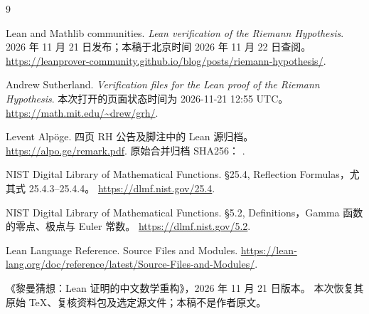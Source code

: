 \documentclass[UTF8,fontset=fandol,a4paper,openany,oneside]{ctexbook}
\theoremstyle{definition}
\theoremstyle{remark}
\begin{document}
\backmatter
\begin{thebibliography}{9}
Lean and Mathlib communities.
\emph{Lean verification of the Riemann Hypothesis}.
2026 年 11 月 21 日发布；本稿于北京时间 2026 年 11 月 22 日查阅。
\url{https://leanprover-community.github.io/blog/posts/riemann-hypothesis/}.

Andrew Sutherland.
\emph{Verification files for the Lean proof of the Riemann Hypothesis}.
本次打开的页面状态时间为 2026-11-21 12:55 UTC。
\url{https://math.mit.edu/~drew/grh/}.

Levent Alpöge.
四页 RH 公告及脚注中的 Lean 源归档。
\url{https://alpo.ge/remark.pdf}.
原始合并归档 SHA256：
.

NIST Digital Library of Mathematical Functions.
§25.4, Reflection Formulas，尤其式 25.4.3--25.4.4。
\url{https://dlmf.nist.gov/25.4}.

NIST Digital Library of Mathematical Functions.
§5.2, Definitions，Gamma 函数的零点、极点与 Euler 常数。
\url{https://dlmf.nist.gov/5.2}.

Lean Language Reference. Source Files and Modules.
\url{https://lean-lang.org/doc/reference/latest/Source-Files-and-Modules/}.

《黎曼猜想：Lean 证明的中文数学重构》，2026 年 11 月 21 日版本。
本次恢复其原始 TeX、复核资料包及选定源文件；本稿不是作者原文。
\end{thebibliography}
\end{document}
